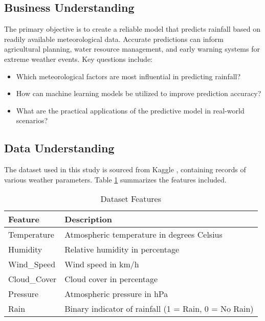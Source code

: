 \documentclass[12pt]{article}
\begin{document}
\subsection{Business Understanding}
The primary objective is to create a reliable model that predicts rainfall based on readily available meteorological data. Accurate predictions can inform agricultural planning, water resource management, and early warning systems for extreme weather events. Key questions include:

\begin{itemize}
    \item Which meteorological factors are most influential in predicting rainfall?
    \item How can machine learning models be utilized to improve prediction accuracy?
    \item What are the practical applications of the predictive model in real-world scenarios?
\end{itemize}

\subsection{Data Understanding}
The dataset used in this study is sourced from Kaggle \cite{weather}, containing records of various weather parameters. Table \ref{tab:dataset_features} summarizes the features included.

\begin{table}[H]
\centering
\caption{Dataset Features}
\label{tab:dataset_features}
\begin{tabular}{ll}
\toprule
\textbf{Feature}      & \textbf{Description}                            \\
\midrule
Temperature           & Atmospheric temperature in degrees Celsius      \\
Humidity              & Relative humidity in percentage                 \\
Wind\_Speed           & Wind speed in km/h                              \\
Cloud\_Cover          & Cloud cover in percentage                       \\
Pressure              & Atmospheric pressure in hPa                     \\
Rain                  & Binary indicator of rainfall (1 = Rain, 0 = No Rain) \\
\bottomrule
\end{tabular}
\end{table}
\end{document}
